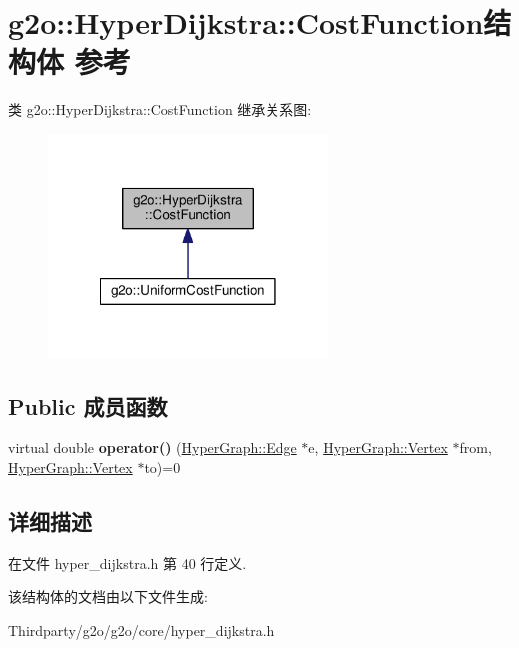\hypertarget{structg2o_1_1HyperDijkstra_1_1CostFunction}{\section{g2o\-:\-:Hyper\-Dijkstra\-:\-:Cost\-Function结构体 参考}
\label{structg2o_1_1HyperDijkstra_1_1CostFunction}
}


类 g2o\-:\-:Hyper\-Dijkstra\-:\-:Cost\-Function 继承关系图\-:
\nopagebreak
\begin{figure}[H]
\begin{center}
\leavevmode
\includegraphics[width=210pt]{structg2o_1_1HyperDijkstra_1_1CostFunction__inherit__graph}
\end{center}
\end{figure}
\subsection*{Public 成员函数}
\begin{DoxyCompactItemize}
\item 
\hypertarget{structg2o_1_1HyperDijkstra_1_1CostFunction_a6d30ca80400c75941851ae079cfd42fd}{virtual double {\bfseries operator()} (\hyperlink{classg2o_1_1HyperGraph_1_1Edge}{Hyper\-Graph\-::\-Edge} $\ast$e, \hyperlink{classg2o_1_1HyperGraph_1_1Vertex}{Hyper\-Graph\-::\-Vertex} $\ast$from, \hyperlink{classg2o_1_1HyperGraph_1_1Vertex}{Hyper\-Graph\-::\-Vertex} $\ast$to)=0}\label{structg2o_1_1HyperDijkstra_1_1CostFunction_a6d30ca80400c75941851ae079cfd42fd}

\end{DoxyCompactItemize}


\subsection{详细描述}


在文件 hyper\-\_\-dijkstra.\-h 第 40 行定义.



该结构体的文档由以下文件生成\-:\begin{DoxyCompactItemize}
\item 
Thirdparty/g2o/g2o/core/hyper\-\_\-dijkstra.\-h\end{DoxyCompactItemize}

